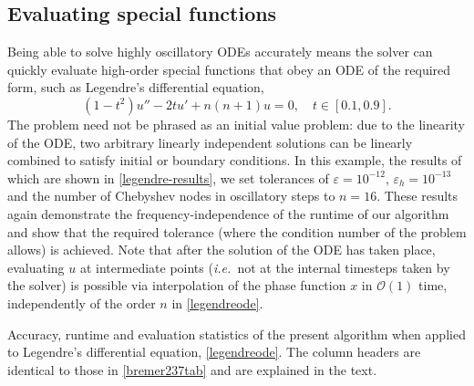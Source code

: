 \documentclass[10pt]{article}
\newcommand{\be}{\begin{equation}}
\newcommand{\ee}{\end{equation}}
\newcommand{\ie}{{\it i.e.\ }}
\newcommand{\bigO}{{\mathcal O}}
\begin{document}
\subsection{Evaluating special functions}

Being able to solve highly oscillatory ODEs accurately means the solver can
quickly evaluate high-order special functions that obey an ODE of the required
form, such as Legendre's differential equation,
\be\label{legendreode}
(1-t^2)u'' - 2tu' + n(n+1)u = 0, \quad t \in [0.1, 0.9]. 
\ee
The problem need not be phrased as an initial value problem: due to the
linearity of the ODE, two arbitrary linearly independent solutions can be
linearly combined to satisfy initial or boundary conditions. In this example,
the results of which are shown in \cref{legendre-results}, we set tolerances of
$\varepsilon = 10^{-12}$, $\varepsilon_h = 10^{-13}$ and the number of
Chebyshev nodes in oscillatory steps to $n = 16$. 
These results again demonstrate the frequency-independence of the runtime of
our algorithm and show that the required tolerance (where the condition number
of the problem allows) is achieved. Note that after the solution of the ODE has
taken place, evaluating $u$ at intermediate points (\ie not at the internal
timesteps taken by the solver) is possible via interpolation of the phase
function $x$ in $\bigO(1)$ time, independently of the order $n$ in \cref{legendreode}.


\begin{table}
    \renewcommand{\arraystretch}{1.2}
    \resizebox{\textwidth}{!}{}
    \caption{Accuracy, runtime and evaluation statistics of the present algorithm when
    applied to Legendre's differential equation, \cref{legendreode}. The column
    headers are identical to those in \cref{bremer237tab} and are explained in
    the text. \label{legendre-results}}
\end{table}
\end{document}
